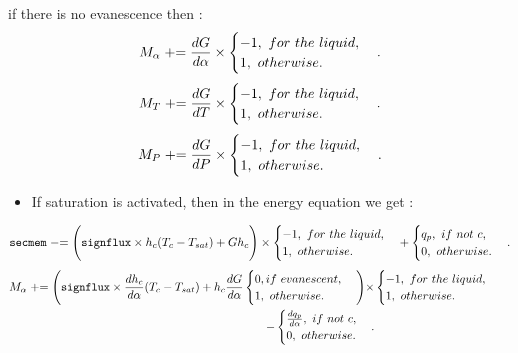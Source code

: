 if there is no evanescence then :
\begin{equation}
    M_\alpha \mathrel{+}= \frac{dG}{d\alpha}\times \begin{cases} -1,\ for\ the\ liquid, \\ 1,\ otherwise. \end{cases}.
\end{equation}
\begin{equation}
    M_T \pluseq \frac{dG}{dT}\times \begin{cases} -1,\ for\ the\ liquid, \\ 1,\ otherwise. \end{cases}.
\end{equation}
\begin{equation}
    M_P \pluseq \frac{dG}{dP}\times \begin{cases} -1,\ for\ the\ liquid, \\ 1,\ otherwise. \end{cases}.
\end{equation}
\begin{itemize}
    \item[\small \textcolor{blue}{\ding{109}}] If saturation is activated, then in the energy equation we get :
\end{itemize}
\begin{equation}
    \texttt{secmem} \mathrel{-}= \Bigg(\texttt{signflux}\times h_c(T_c-T_{sat})+Gh_c\Bigg)\times \begin{cases} -1,\ for\ the\ liquid, \\ 1,\ otherwise. \end{cases} + \begin{cases} q_p,\ if\ not\ c, \\ 0,\ otherwise. \end{cases}.
\end{equation}
\begin{equation}
\begin{aligned}
    M_\alpha \mathrel{+}= \Bigg(\texttt{signflux}\times \frac{dh_c}{d\alpha}(T_c-T_{sat})+h_c\frac{dG}{d\alpha}\begin{cases} 0, if\ evanescent,\\ 1,\ otherwise. \end{cases}\Bigg)\times & \begin{cases} -1,\ for\ the\ liquid, \\ 1,\ otherwise. \end{cases} & \\- \begin{cases} \frac{dq_p}{d\alpha},\ if\ not\ c, \\ 0,\ otherwise. \end{cases}.
\end{aligned}
\end{equation}
